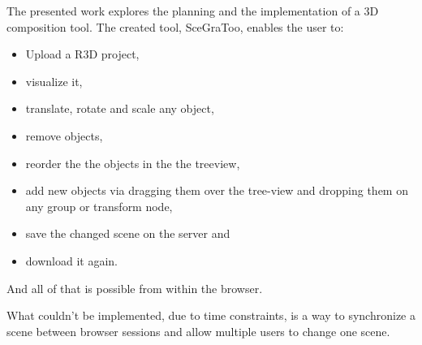 The presented work explores the planning and the implementation of a \gls{3D} composition tool. The created tool, \gls{SceGraToo}, enables the user to:

\begin{itemize}
  \item Upload a \gls{R3D} project,
  \item visualize it,
  \item translate, rotate and scale any object,
  \item remove objects,
  \item reorder the the objects in the the treeview,
  \item add new objects via dragging them over the tree-view and dropping them on any group or transform node,
  \item save the changed scene on the server and
  \item download it again.
\end{itemize}

And all of that is possible from within the browser.

What couldn't be implemented, due to time constraints, is a way to synchronize a scene between browser sessions and allow multiple users to change one scene.

